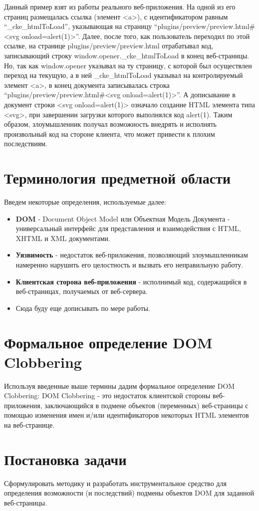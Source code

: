 Данный пример взят из работы реального веб-приложения. На одной из его страниц размещалась ссылка (элемент <a>), с идентификатором равным \\
“\_cke\_htmlToLoad”, указывающая на страницу “plugins/preview/preview.html\#<svg onload=alert(1)>”. Далее, после того, как пользователь переходил по этой ссылке, на странице plugins/preview/preview.html отрабатывал код, записывающий строку window.opener.\_cke\_htmlToLoad в конец веб-страницы. Но, так как window.opener указывал на ту страницу, с которой был осуществлен переход на текущую, а в ней \_cke\_htmlToLoad указывал на контролируемый элемент <a>, в конец документа записывалась строка “plugins/preview/preview.html\#<svg onload=alert(1)>”. А дописывание в документ строки <svg onload=alert(1)> означало создание HTML элемента типа <svg>, при завершении загрузки которого выполнялся код alert(1).
Таким образом, злоумышленник получал возможность внедрять и исполнять произвольный код на стороне клиента, что может привести к плохим последствиям.

\section{Терминология предметной области}

Введем некоторые определения, используемые далее:
\begin{itemize}
    \item \textbf{DOM} - Document Object Model или Объектная Модель Документа - универсальный интерфейс для представления и взаимодействия с HTML, XHTML и XML документами.
    \item \textbf{Уязвимость} - недостаток веб-приложения, позволяющий злоумышленникам намеренно нарушить его целостность и вызвать его неправильную работу.
    \item \textbf{Клиентская сторона веб-приложения} - исполнимый код, содержащийся в веб-страницах, получаемых от веб-сервера.
   	\item Сюда буду еще дописывать по мере работы.
\end{itemize}

\section{Формальное определение DOM Clobbering}

Используя введенные выше термины дадим формальное определение DOM Clobbering: DOM Clobbering - это недостаток клиентской стороны веб-приложения, заключающийся в подмене объектов (переменных) веб-страницы с помощью изменения имен и/или идентификаторов некоторых HTML элементов на веб-странице.

\section{Постановка задачи}
Сформулировать методику и разработать инструментальное средство для определения возможности (и последствий) подмены объектов DOM для заданной веб-страницы.